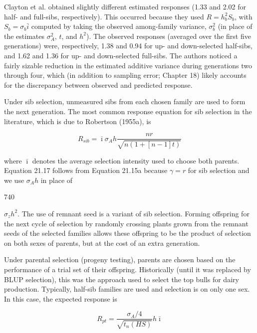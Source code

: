 \documentclass{article}
\begin{document}
Clayton et al. obtained slightly different estimated responses (1.33 and 2.02 for half- and full-sibs, respectively). This occurred because they used  $ R = h_b^2 S_b $, with  $ S_b = \sigma_b \bar{i} $ computed by taking the observed among-family variance,  $ \sigma_b^2 $ (in place of the estimates  $ \sigma_A^2 $,  $ t $, and  $ h^2 $). The observed responses (averaged over the first five generations) were, respectively, 1.38 and 0.94 for up- and down-selected half-sibs, and 1.62 and 1.36 for up- and down-selected full-sibs. The authors noticed a fairly sizable reduction in the estimated additive variance during generations two through four, which (in addition to sampling error; Chapter 18) likely accounts for the discrepancy between observed and predicted response.

Under sib selection, unmeasured sibs from each chosen family are used to form the next generation. The most common response equation for sib selection in the literature, which is due to Robertson (1955a), is

\begin{equation}
R_{s i b}=\bar{\imath}\sigma_{A}h\frac{n r}{\sqrt{n(1+\left[n-1\right]t)}}
\tag{21.17}
\label{eq:21_17}
\end{equation}

where  $ \bar{\imath} $ denotes the average selection intensity used to choose both parents. Equation 21.17 follows from Equation 21.15a because  $ \gamma = r $ for sib selection and we use  $ \sigma_{A}h $ in place of

740

 $ \sigma_{z}h^{2} $. The use of remnant seed is a variant of sib selection. Forming offspring for the next cycle of selection by randomly crossing plants grown from the remnant seeds of the selected families allows these offspring to be the product of selection on both sexes of parents, but at the cost of an extra generation.

Under parental selection (progeny testing), parents are chosen based on the performance of a trial set of their offspring. Historically (until it was replaced by BLUP selection), this was the approach used to select the top bulls for dairy production. Typically, half-sib families are used and selection is on only one sex. In this case, the expected response is

\begin{equation}
R_{pt}=\frac{\sigma_{A}/4}{\sqrt{t_{n}(HS)}}h\bar{\imath}
\tag{21.18a}
\label{eq:21_18a}
\end{equation}
\end{document}

